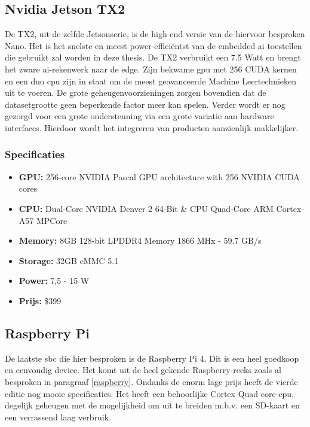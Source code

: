 	
	\subsection{Nvidia Jetson TX2}
	De TX2, uit de zelfde Jetsonserie, is de high end versie van de hiervoor besproken Nano\citep{bron:jetsontx2}. Het is het snelste en meest power-effici\"entst van de embedded \gls{ai} toestellen die gebruikt zal worden in deze thesis. De TX2 verbruikt een 7.5 Watt en brengt het zware \gls{ai}-rekenwerk naar de edge. Zijn bekwame \gls{gpu} met 256 CUDA kernen en een duo \gls{cpu} zijn in staat om de meest geavanceerde Machine Leertechnieken uit te voeren. De grote geheugenvoorzieningen zorgen bovendien dat de datasetgrootte geen beperkende factor meer kan spelen. Verder wordt er nog gezorgd voor een grote ondersteuning via een grote variatie aan hardware interfaces. Hierdoor wordt het integreren van producten aanzienlijk makkelijker.
	
		\subsubsection{Specificaties}
		\begin{itemize}
			\item \textbf{GPU:} 256-core NVIDIA Pascal GPU architecture with 256 NVIDIA CUDA cores
			\item \textbf{CPU:} Dual-Core NVIDIA Denver 2 64-Bit \& CPU Quad-Core ARM Cortex-A57 MPCore
			\item \textbf{Memory:} 8GB 128-bit LPDDR4 Memory 1866 MHx - 59.7 GB/s
			\item \textbf{Storage:}  32GB eMMC 5.1
			\item \textbf{Power:} 7,5 - 15 W
			\item \textbf{Prijs:} \$399
		\end{itemize}	
	
	
	\subsection{Raspberry Pi}
	De laatste \gls{sbc} die hier besproken is de Raspberry Pi 4\citep{bron:rpi4}. Dit is een heel goedkoop en eenvoudig device. Het komt uit de heel gekende Raspberry-reeks zoals al besproken in paragraaf \ref{raspberry}. Ondanks de enorm lage prijs heeft de vierde editie nog mooie specificaties. Het heeft een behoorlijke Cortex Quad core-\gls{cpu}, degelijk geheugen met de mogelijkheid om uit te breiden m.b.v. een SD-kaart en een verrassend laag verbruik. 
	
